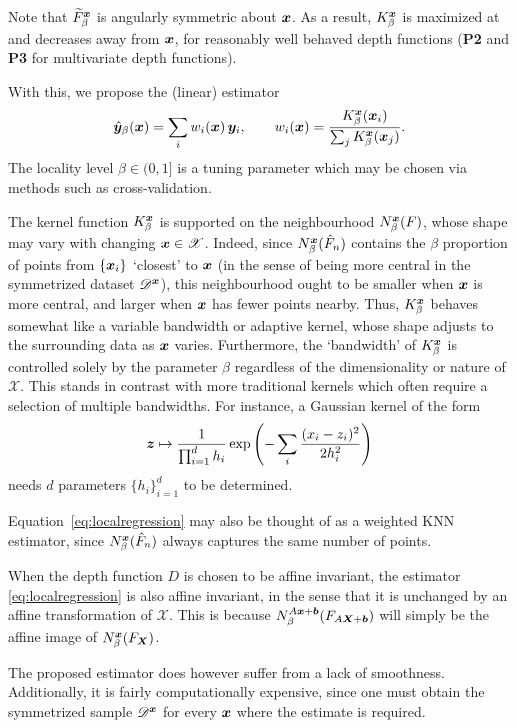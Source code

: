 Note that $\widetilde{F}^{\bm{x}}_\beta$ is angularly symmetric about $\bm{x}$.
As a result, $K^{\bm{x}}_\beta$ is maximized at and decreases away from $\bm{x}$,
for reasonably well behaved depth functions (\textbf{P2} and \textbf{P3} for
multivariate depth functions).


With this, we propose the (linear) estimator
\begin{equation}
    \hat{\bm{y}}_\beta(\bm{x}) = \sum_i w_i(\bm{x})\, \bm{y}_i, \qquad
    w_i(\bm{x}) = \frac{K^{\bm{x}}_\beta(\bm{x}_i)}{\sum_j K^{\bm{x}}_\beta(\bm{x}_j)}.
    \label{eq:localregression}
\end{equation}
The locality level $\beta \in (0, 1]$ is a tuning parameter which may be
chosen via methods such as cross-validation.

The kernel function $K^{\bm{x}}_\beta$ is supported on the neighbourhood
$N^{\bm{x}}_\beta(F)$, whose shape may vary with changing $\bm{x} \in \mathscr{X}$.
Indeed, since $N^{\bm{x}}_\beta(\hat{F}_n)$ contains the $\beta$ proportion of
points from $\{\bm{x}_i\}$ `closest' to $\bm{x}$ (in the sense of being more central
in the symmetrized dataset $\mathscr{D}^{\bm{x}}$), this neighbourhood ought to
be smaller when $\bm{x}$ is more central, and larger when $\bm{x}$ has fewer points
nearby.
Thus, $K^{\bm{x}}_\beta$ behaves somewhat like a variable bandwidth or adaptive
kernel, whose shape adjusts to the surrounding data as $\bm{x}$ varies.
Furthermore, the `bandwidth' of $K^{\bm{x}}_\beta$ is controlled solely by the
parameter $\beta$ regardless of the dimensionality or nature of $\mathscr{X}$.
This stands in contrast with more traditional kernels which often require a
selection of multiple bandwidths.
For instance, a Gaussian kernel of the form
\begin{equation}
    \bm{z} \mapsto \frac{1}{\prod_{i = 1}^d h_i} \exp\left(-\sum_i \frac{(x_i - z_i)^2}{2h_i^2}\right)
    \label{eq:kernel_gaussian}
\end{equation}
needs $d$ parameters $\{h_i\}_{i = 1}^d$ to be determined.

Equation~\ref{eq:localregression} may also be thought of as a weighted KNN
estimator, since $N^{\bm{x}}_\beta(\hat{F}_n)$ always captures the same number of
points.

When the depth function $D$ is chosen to be affine invariant, the estimator
\ref{eq:localregression} is also affine invariant, in the sense that it is
unchanged by an affine transformation of $\mathscr{X}$.
This is because $N^{A\bm{x} + \bm{b}}_\beta(F_{A\bm{X} + \bm{b}})$ will simply be
the affine image of $N^{\bm{x}}_\beta(F_{\bm{X}})$.

The proposed estimator does however suffer from a lack of smoothness.
Additionally, it is fairly computationally expensive, since one must obtain
the symmetrized sample $\mathscr{D}^{\bm{x}}$ for every $\bm{x}$ where the estimate
is required.

